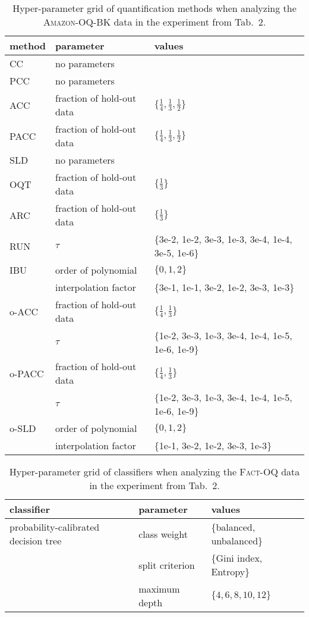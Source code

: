 \documentclass[10pt,a4paper]{article}
\begin{document}
\begin{table}
  \centering
  \caption{Hyper-parameter grid of quantification methods when analyzing the \textsc{Amazon-OQ-BK} data in the experiment from Tab.~2.}
  \label{tab:hyperparameter-roberta-quantifier}
  \footnotesize
  \begin{tabular}{lll}
    \toprule
    method & parameter & values \\
    \midrule
    CC & no parameters & \\
    PCC & no parameters & \\
    ACC & fraction of hold-out data & $\{\frac{1}{4}, \frac{1}{3}, \frac{1}{2}\}$ \\
    PACC & fraction of hold-out data & $\{\frac{1}{4}, \frac{1}{3}, \frac{1}{2}\}$ \\
    SLD & no parameters & \\
    \midrule
    OQT & fraction of hold-out data & $\{\frac{1}{3}\}$ \\
    ARC & fraction of hold-out data & $\{\frac{1}{3}\}$ \\
    RUN & $\tau$ & $\{$3e-2, 1e-2, 3e-3, 1e-3, 3e-4, 1e-4, 3e-5, 1e-6$\}$ \\
    IBU & order of polynomial & $\{0, 1, 2\}$ \\
        & interpolation factor & $\{$3e-1, 1e-1, 3e-2, 1e-2, 3e-3, 1e-3$\}$ \\
    \midrule
    o-ACC & fraction of hold-out data & $\{\frac{1}{4}, \frac{1}{3}\}$ \\
          & $\tau$ & $\{$1e-2, 3e-3, 1e-3, 3e-4, 1e-4, 1e-5, 1e-6, 1e-9$\}$ \\
    o-PACC & fraction of hold-out data & $\{\frac{1}{4}, \frac{1}{3}\}$ \\
           & $\tau$ & $\{$1e-2, 3e-3, 1e-3, 3e-4, 1e-4, 1e-5, 1e-6, 1e-9$\}$ \\
    o-SLD & order of polynomial & $\{0, 1, 2\}$ \\
        & interpolation factor & $\{$1e-1, 3e-2, 1e-2, 3e-3, 1e-3$\}$ \\
    \bottomrule
  \end{tabular}
\end{table}

\begin{table}
  \centering
  \caption{Hyper-parameter grid of classifiers when analyzing the \textsc{Fact-OQ} data in the experiment from Tab.~2.}
  \label{tab:hyperparameter-fact-classifier}
  \footnotesize
  \begin{tabular}{lll}
    \toprule
    classifier & parameter & values \\
    \midrule
    probability-calibrated decision tree & class weight & \{balanced, unbalanced\} \\
    & split criterion & \{Gini index, Entropy\} \\
    & maximum depth & $\{4, 6, 8, 10, 12\}$ \\
    \bottomrule
  \end{tabular}
\end{table}
\end{document}
